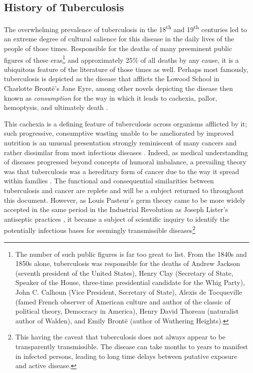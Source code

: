 \subsection{History of Tuberculosis}\label{tbhistory}

The overwhelming prevalence of tuberculosis in the 18\textsuperscript{th} and 19\textsuperscript{th} centuries led to an extreme degree of cultural salience for this disease in the daily lives of the people of those times. Responsible for the deaths of many preeminent public figures of these eras\footnote{The number of such public figures is far too great to list. From the 1840s and 1850s alone, tuberculosis was responsible for the deaths of Andrew Jackson (seventh president of the United States), Henry Clay (Secretary of State, Speaker of the House, three-time presidential candidate for the Whig Party), John C. Calhoun (Vice President, Secretary of State), Alexis de Tocqueville (famed French observer of American culture and author of the classic of political theory, Democracy in America), Henry David Thoreau (naturalist author of Walden), and Emily Bront\"{e} (author of Wuthering Heights).} and approximately 25\% of all deaths by any cause, it is  a ubiquitous feature of the literature of those times as well. Perhaps most famously, tuberculosis is depicted as the disease that afflicts the Lowood School in Charlotte Bront\"{e}'s Jane Eyre, among other novels depicting the disease then known as \textit{consumption} for the way in which it leads to cachexia, pallor, hemoptysis, and ultimately death \citep{Bronte1847, Loddenkember2015}.

This cachexia is a defining feature of tuberculosis across organisms afflicted by it; such progressive, consumptive wasting unable to be ameliorated by improved nutrition is an unusual presentation strongly reminiscent of many cancers and rather dissimilar from most infectious diseases \citep{Tisdale2002, Silva1988, Martignoni2003, Chang2013}. Indeed, as medical understanding of diseases progressed beyond concepts of humoral imbalance, a prevailing theory was that tuberculosis was a hereditary form of cancer due to the way it spread within families \citep{Frith2014}. The functional and consequential similarities between tuberculosis and cancer are replete and will be a subject returned to throughout this document. However, as Louis Pasteur's germ theory \citep{Smith2012} came to be more widely accepted in the same period in the Industrial Revolution as Joseph Lister's antiseptic practices \citep{ToledoPereyra2010}, it became a subject of scientific inquiry to identify the potentially infectious bases for seemingly transmissible diseases\footnote{This having the caveat that tuberculosis does not always appear to be transparently transmissible. The disease can take months to years to manifest in infected persons, leading to long time delays between putative exposure and active disease\citep{Behr2018}.} 

